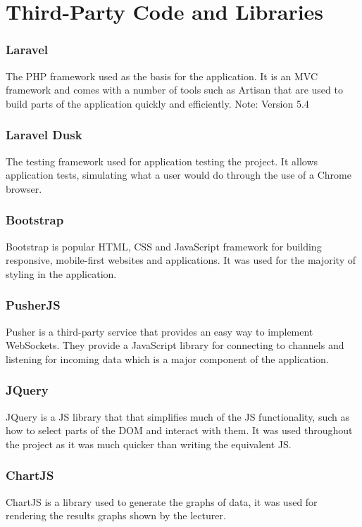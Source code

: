 \chapter{Third-Party Code and Libraries}
\subsection{Laravel}
The PHP framework used as the basis for the application\cite{laravel}. It is an MVC framework and comes with a number of tools such as Artisan\cite{artisan} that are used to build parts of the application quickly and efficiently. Note: Version 5.4
\subsection{Laravel Dusk}
The testing framework used for application testing the project\cite{dusk}. It allows application tests, simulating what a user would do through the use of a Chrome browser.
\subsection{Bootstrap}
Bootstrap is popular HTML, CSS and JavaScript framework for building responsive, mobile-first websites and applications\cite{bootstrap}. It was used for the majority of styling in the application.
\subsection{PusherJS}
Pusher is a third-party service that provides an easy way to implement WebSockets\cite{pusher-what-is}. They provide a JavaScript library for connecting to channels and listening for incoming data which is a major component of the application.
\subsection{JQuery}
JQuery is a JS library that that simplifies much of the JS functionality, such as how to select parts of the DOM and interact with them\cite{jquery}. It was used throughout the project as it was much quicker than writing the equivalent JS.
\subsection{ChartJS}
ChartJS is a library used to generate the graphs of data, it was used for rendering the results graphs shown by the lecturer\cite{chartjs}.